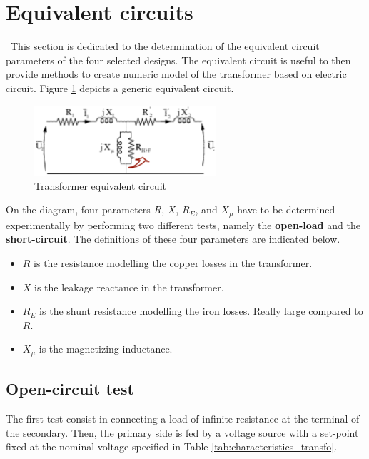\documentclass[12pt,a4paper]{report}
\begin{document}
\section{Equivalent circuits}
\quad\, This section is dedicated to the determination of the equivalent circuit parameters of the four selected designs. The equivalent circuit is useful to then provide methods to create numeric model of the transformer based on electric circuit. Figure \ref{fig:equivalent_circuit} depicts a generic equivalent circuit.

 \begin{figure}[h]
    \centering
    \includegraphics[width=0.6\textwidth]{equivalent_circuit.PNG}
    \caption{Transformer equivalent circuit}
    \label{fig:equivalent_circuit}
\end{figure}

On the diagram, four parameters $R$, $X$, $R_{E}$, and $X_\mu$ have to be determined experimentally by performing two different tests, namely the \textbf{open-load} and the \textbf{short-circuit}. The definitions of these four parameters are indicated below.

\begin{itemize}
    \item $R$ is the resistance modelling the copper losses in the transformer. 
    \item $X$ is the leakage reactance in the transformer.
    \item $R_E$ is the shunt resistance modelling the iron losses. Really large compared to $R$.
    \item $X_\mu$ is the magnetizing inductance.
\end{itemize}

\subsection{Open-circuit test}
The first test consist in connecting a load of infinite resistance at the terminal of the secondary. Then, the primary side is fed by a voltage source with a set-point fixed at the nominal voltage specified in Table \ref{tab:characteristics_transfo}. 
\end{document}

